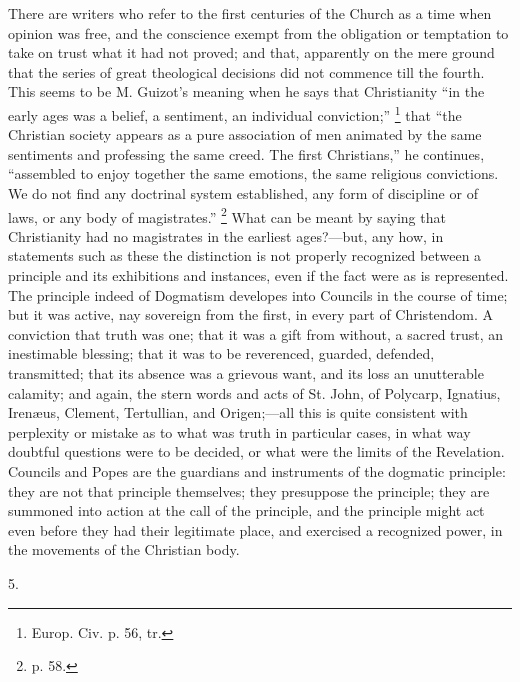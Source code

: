 There are writers who refer to the first centuries of
the Church as a time when opinion was free, and the
conscience exempt from the obligation or temptation to
take on trust what it had not proved; and that,
apparently on the mere ground that the series of
great theological decisions did not commence till the
fourth. This seems to be M. Guizot's meaning when he says
that Christianity ``in the early ages was a belief, a
sentiment, an individual conviction;'' \footnote{Europ. Civ. p. 56, tr.} that ``the
Christian society appears as a pure association of men
animated by the same sentiments and professing the same
creed. The first Christians,'' he continues,
``assembled to enjoy together the same emotions, the
same religious convictions. We do not find any doctrinal
system established, any form of discipline or of laws, or
any body of magistrates.'' \footnote{p. 58.} What can be meant by saying
that Christianity had no magistrates in the earliest
ages?—but, any how, in statements such as these the
distinction is not properly recognized between a
principle and its exhibitions and instances, even if the
fact were as is represented. The principle indeed of
Dogmatism developes into Councils in the course of time;
but it was active, nay sovereign from the first, in every
part of Christendom. A conviction that truth was one;
that it was a gift from without, a sacred trust, an
inestimable blessing; that it was to be reverenced,
guarded, defended, transmitted; that its absence was a
grievous want, and its loss an unutterable calamity; and
again, the stern words and acts of St. John, of Polycarp,
Ignatius, Irenæus, Clement, Tertullian, and
Origen;—all this is quite consistent with perplexity
or mistake as to what was truth in particular cases, in
what way doubtful questions were to be decided, or what
were the limits of the Revelation. Councils and Popes are
the guardians and instruments of the dogmatic principle:
they are not that principle themselves; they presuppose
the principle; they are summoned into action at the call
of the principle, and the principle might act even before
they had their legitimate place, and exercised a
recognized power, in the movements of the Christian body.

5.

